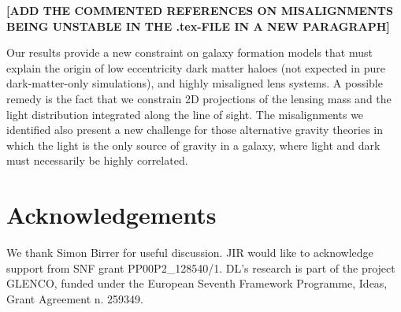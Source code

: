 \documentclass[useAMS,usenatbib]{mn2e}
\begin{document}
\textbf{[ADD THE COMMENTED REFERENCES ON MISALIGNMENTS BEING UNSTABLE IN THE .tex-FILE IN A NEW PARAGRAPH]}

Our results provide a new constraint on galaxy formation models that must explain the origin of low eccentricity dark matter haloes (not expected in pure dark-matter-only simulations), and highly misaligned lens systems. A possible remedy is the fact that we constrain 2D projections of the lensing mass and the light distribution integrated along the line of sight. The misalignments we identified also present a new challenge for those alternative gravity theories in which the light is the only source of gravity in a galaxy, where light and dark must necessarily be highly correlated.


\section{Acknowledgements}\label{sec:acknowledgements}
We thank Simon Birrer for useful discussion. JIR would like to acknowledge support from SNF grant PP00P2\_128540/1. DL's research is part of the project GLENCO, funded under the European Seventh Framework Programme, Ideas, Grant Agreement n. 259349.






\appendix
\end{document}
